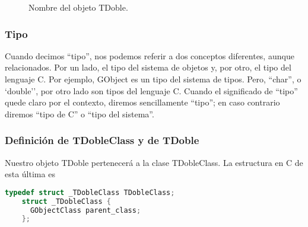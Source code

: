 \begin{figure}[ht]
  \centering
  \def\scl{1}
\caption{Nombre del objeto \textsf{TDoble}.}
\label{fig:nombre-objetos}
\end{figure}


\subsubsection{Tipo}
Cuando decimos ``tipo'', nos podemos referir a dos conceptos diferentes, aunque relacionados.
Por un lado, el tipo del sistema de objetos y, por otro, el tipo del lenguaje C. Por ejemplo, \textsf{GObject} es
un tipo del sistema de tipos. Pero, ``char'', o `double'', por otro lado son tipos del lenguaje C.
Cuando el significado de ``tipo'' quede claro por el contexto, diremos sencillamente ``tipo''; en caso contrario
diremos ``tipo de C'' o ``tipo del sistema''.

\subsubsection{Definición de \textsf{TDobleClass} y de \textsf{TDoble}}
  Nuestro objeto \textsf{TDoble} pertenecerá a la clase \textsf{TDobleClass}. La estructura en C de esta última es
  \begin{lstlisting}[language=C]
    typedef struct _TDobleClass TDobleClass;
    struct _TDobleClass {
      GObjectClass parent_class;
    };
  \end{lstlisting}

